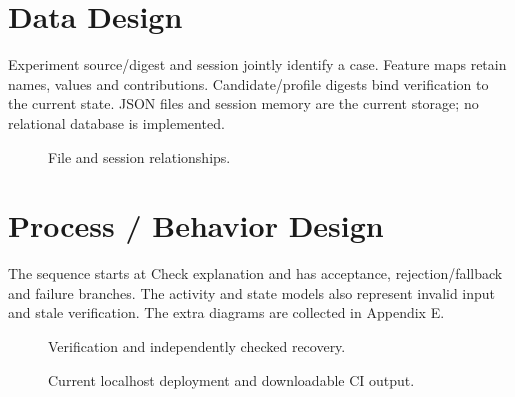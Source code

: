 \section{Data Design}
Experiment source/digest and session jointly identify a case. Feature maps retain names, values and contributions. Candidate/profile digests bind verification to the current state. JSON files and session memory are the current storage; no relational database is implemented.
\begin{figure}[htbp]\centering\caption{File and session relationships.}\label{fig:schema}\end{figure}
\section{Process / Behavior Design}
The sequence starts at Check explanation and has acceptance, rejection/fallback and failure branches. The activity and state models also represent invalid input and stale verification. The extra diagrams are collected in Appendix E.
\begin{figure}[htbp]\centering\caption{Verification and independently checked recovery.}\label{fig:sequence}\end{figure}
\begin{figure}[htbp]\centering\caption{Current localhost deployment and downloadable CI output.}\label{fig:deployment}\end{figure}
